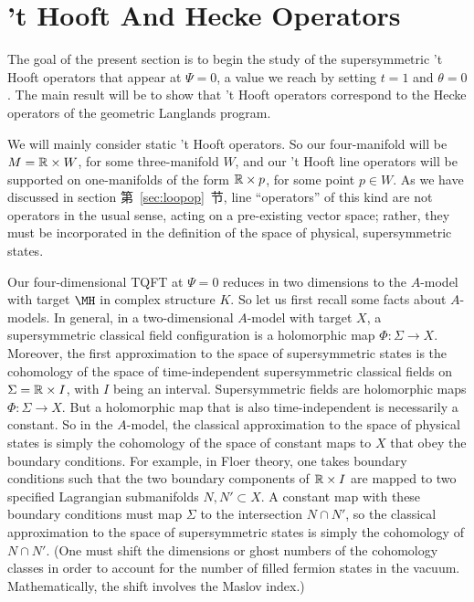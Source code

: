
\section{'t Hooft And Hecke Operators}
\label{sec:thooftheckeop}

 The goal of the present section is to begin the study of
the supersymmetric 't Hooft operators that appear at $\Psi=0$, a
value we reach by setting $t=1$ and $\theta=0$.  The main result
will be to show that 't Hooft operators correspond to the Hecke
operators of the geometric Langlands program.

We will mainly consider static 't Hooft operators. So our
four-manifold will be $M=\Bbb{R}\times W$, for some three-manifold
$W$, and our 't Hooft line operators will be supported on
one-manifolds of the form $\Bbb{R}\times p$, for some point $p\in
W$.  As we have discussed in section 第~\ref{sec:loopop}~节, line ``operators''
of this kind are not operators in the usual sense, acting on a
pre-existing vector space; rather, they must be incorporated in
the definition of the space of physical, supersymmetric states.

Our four-dimensional TQFT at $\Psi=0$ reduces in two dimensions to
the $A$-model with target $\MH$ in complex structure $K$.  So let
us first recall some facts about $A$-models.  In general, in a
two-dimensional $A$-model with target $X$, a supersymmetric
classical field configuration is a holomorphic map $\Phi:\Sigma\to
X$. Moreover, the first approximation to the space of
supersymmetric states is the cohomology of the space of
time-independent supersymmetric classical fields on
$\Sigma=\Bbb{R}\times I$, with $I$ being an interval.
Supersymmetric fields are holomorphic maps  $\Phi:\Sigma\to X$.
But a holomorphic map that is also time-independent is necessarily
a constant. So in the $A$-model, the classical approximation to
the space of physical states is simply the cohomology of the space
of constant maps to $X$ that obey the boundary conditions.   For
example, in Floer theory, one takes boundary conditions such that
the two boundary components of $\Bbb{R}\times I$ are mapped to two
specified Lagrangian submanifolds $N,N'\subset X$. A constant map
with these boundary conditions must map $\Sigma$ to the
intersection $N\cap N'$, so the classical approximation to the
space of supersymmetric states is simply the cohomology of $N\cap
N'$.  (One must shift the dimensions or ghost numbers of the
cohomology classes in order to account for the number of filled
fermion states in the vacuum. Mathematically, the shift involves
the Maslov index.)

